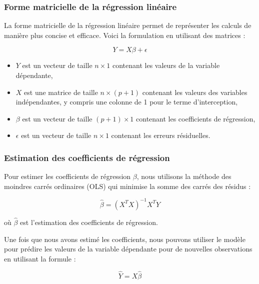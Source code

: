 \documentclass{beamer}
\begin{document}
\begin{frame}
	\frametitle{Forme matricielle de la régression linéaire}
	
	La forme matricielle de la régression linéaire permet de représenter les calculs de manière plus concise et efficace. Voici la formulation en utilisant des matrices :
	
	\begin{equation*}
		Y = X\beta + \epsilon
	\end{equation*}
	
	\begin{itemize}
		\item $Y$ est un vecteur de taille $n \times 1$ contenant les valeurs de la variable dépendante,
		\item $X$ est une matrice de taille $n \times (p+1)$ contenant les valeurs des variables indépendantes, y compris une colonne de 1 pour le terme d'interception,
		\item $\beta$ est un vecteur de taille $(p+1) \times 1$ contenant les coefficients de régression,
		\item $\epsilon$ est un vecteur de taille $n \times 1$ contenant les erreurs résiduelles.
	\end{itemize}
\end{frame}

\begin{frame}
	\frametitle{Estimation des coefficients de régression}
	
	Pour estimer les coefficients de régression $\beta$, nous utilisons la méthode des moindres carrés ordinaires (OLS) qui minimise la somme des carrés des résidus :
	
	\begin{equation*}
		\hat{\beta} = (X^TX)^{-1}X^TY
	\end{equation*}
	
	où $\hat{\beta}$ est l'estimation des coefficients de régression.
	
	Une fois que nous avons estimé les coefficients, nous pouvons utiliser le modèle pour prédire les valeurs de la variable dépendante pour de nouvelles observations en utilisant la formule :
	
	\begin{equation*}
		\hat{Y} = X\hat{\beta}
	\end{equation*}
\end{frame}
\end{document}
